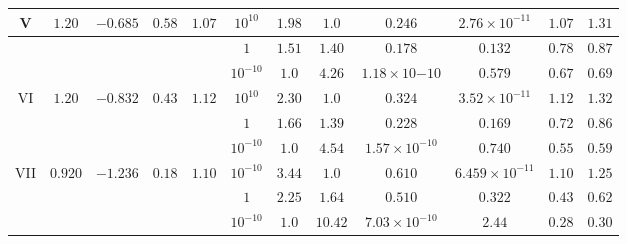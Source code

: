\documentclass[twocolumn,aps,showpacs,showkeys,prd,superscriptaddress,byrevtex, amsmath]{revtex4-1}
\begin{document}
\begin{table}[t]
\begin{tabular}{c c c c c  c c c c c c c}
\hline   
V & $1.20$ & $-0.685$ & $0.58$ & $1.07$ & $10^{10}$ & $1.98$ & $1.0$ & $0.246$ & $2.76 \times 10^{-11}$ & $1.07$ & $1.31$\\ 
\hline 
 &  &  &  &  & $1$ & $1.51$ & $1.40$ & $0.178$ & $0.132$ & $0.78$ & $0.87$ \\ 
\hline 
 &  &  &  &  & $10^{-10}$ & $1.0$ & $4.26$ & $1.18 \times 10{-10}$ & $0.579$ & $0.67$ & $0.69$ \\ 
\hline   
VI & $1.20$ & $-0.832$ & $0.43$ & $1.12$ & $10^{10}$ & $2.30$ & $1.0$ & $0.324$ & $3.52 \times 10^{-11}$ & $1.12$ & $1.32$ \\ 
\hline 
 &  &  &  &  & $1$ & $1.66$ & $1.39$ & $0.228$ & $0.169$ & $0.72$ & $0.86$ \\ 
\hline 
 &  &  &  &  & $10^{-10}$ & $1.0$ & $4.54$ & $1.57 \times 10^{-10}$ & $0.740$ & $0.55$ & $0.59$ \\ 
\hline 
VII & $0.920$ & $-1.236$ & $0.18$ & $1.10$ & $10^{-10}$ & $3.44$ & $1.0$ & $0.610$ & $6.459 \times 10^{-11}$ & $1.10$ & $1.25$ \\ 
\hline 
 &  &  &  &  & $1$ & $2.25$ & $1.64$ & $0.510$ & $0.322$ & $0.43$ & $0.62$\\ 
\hline 
 &  &  &  &  & $10^{-10}$ & $1.0$ & $10.42$ & $7.03 \times 10^{-10}$ & $2.44$ & $0.28$ & $0.30$\\ 
\hline 
\end{tabular}
\end{table}
\end{document}
